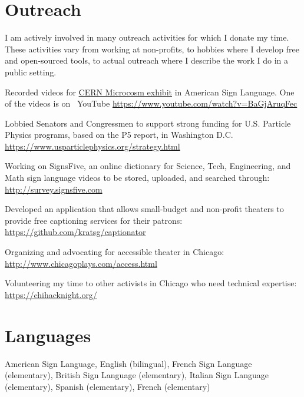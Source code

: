 \documentclass[margin,line]{resume}
\let\origsection\section%
\let\section\subsection%
\let\section\origsection%
\begin{document}
\begin{resume}
\section{\mysidestyle Outreach}
I am actively involved in many outreach activities for which I donate my time. These activities vary from working at non-profits, to hobbies where I develop free and open-sourced tools, to actual outreach where I describe the work I do in a public setting.
\begin{list2}
  \item Recorded videos for \href{https://microcosm.web.cern.ch/en}{CERN Microcosm exhibit} in American Sign Language. One of the videos is on ~YouTube \url{https://www.youtube.com/watch?v=BaGjAruqFec}
  \item Lobbied Senators and Congressmen to support strong funding for U.S. Particle Physics programs, based on the P5 report, in Washington D.C. \url{https://www.usparticlephysics.org/strategy.html}
  \item Working on SignsFive, an online dictionary for Science, Tech, Engineering, and Math sign language videos to be stored, uploaded, and searched through: \url{http://survey.signsfive.com}
  \item Developed an application that allows small-budget and non-profit theaters to provide free captioning services for their patrons: \url{https://github.com/kratsg/captionator}
  \item Organizing and advocating for accessible theater in Chicago: \url{http://www.chicagoplays.com/access.html}
  \item Volunteering my time to other activists in Chicago who need technical expertise: \url{https://chihacknight.org/}
\end{list2}

\section{\mysidestyle Languages}

American Sign Language, English (bilingual), French Sign Language (elementary), British Sign Language (elementary), Italian Sign Language (elementary), Spanish (elementary), French (elementary)


\end{resume}
\end{document}
